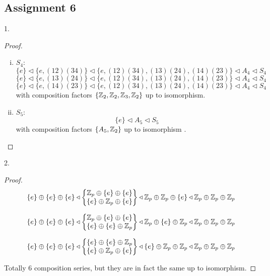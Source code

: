 \subsection{Assignment 6}

\begin{exercise}
    1.
\end{exercise}

\begin{proof}
    \begin{enumerate}[(i)]
        \item $S_4$:
        $$
        \{e\} \triangleleft \{e,(12)(34)\}  \triangleleft\{e,(12)(34),(13)(24),(14)(23)\} \triangleleft A_{4} \triangleleft S_{4}
        $$
        $$
        \{e\} \triangleleft \{e,(13)(24)\}  \triangleleft\{e,(12)(34),(13)(24),(14)(23)\} \triangleleft A_{4} \triangleleft S_{4}
        $$
        $$
        \{e\} \triangleleft \{e,(14)(23)\}  \triangleleft\{e,(12)(34),(13)(24),(14)(23)\} \triangleleft A_{4} \triangleleft S_{4}
        $$
        with composition factors $\{{\mathbb{Z}}_2, {\mathbb{Z}}_2, {\mathbb{Z}}_3, {\mathbb{Z}}_2\}$ up to isomorphism.
        \item $S_5$:
        $$
        \{e\} \triangleleft A_{5} \triangleleft S_{5}
        $$
        with composition factors $\{A_5, {\mathbb{Z}}_2\}$ up to isomorphism
        .
    \end{enumerate}
\end{proof}

\begin{exercise}
    2.
\end{exercise}

\begin{proof}
    $$
    \{e\} \oplus \{e\} \oplus \{e\} \triangleleft 
    \begin{Bmatrix}
    {\mathbb{Z}}_p \oplus \{e\} \oplus \{e\}     \\ 
    \{e\} \oplus {\mathbb{Z}}_p \oplus \{e\}   
    \end{Bmatrix}\triangleleft 
    {\mathbb{Z}}_p \oplus {\mathbb{Z}}_p \oplus \{e\}\triangleleft 
    {\mathbb{Z}}_p \oplus {\mathbb{Z}}_p \oplus {\mathbb{Z}}_p
    $$
    
    $$
    \{e\} \oplus \{e\} \oplus \{e\} \triangleleft 
    \begin{Bmatrix}
    {\mathbb{Z}}_p \oplus \{e\} \oplus \{e\}     \\ 
    \{e\} \oplus \{e\} \oplus {\mathbb{Z}}_p   
    \end{Bmatrix}\triangleleft 
    {\mathbb{Z}}_p \oplus \{e\} \oplus {\mathbb{Z}}_p\triangleleft 
    {\mathbb{Z}}_p \oplus {\mathbb{Z}}_p \oplus {\mathbb{Z}}_p
    $$

    
    $$
    \{e\} \oplus \{e\} \oplus \{e\} \triangleleft 
    \begin{Bmatrix}
    \{e\} \oplus \{e\} \oplus {\mathbb{Z}}_p     \\ 
    \{e\} \oplus {\mathbb{Z}}_p \oplus \{e\}   
    \end{Bmatrix}\triangleleft 
    \{e\} \oplus {\mathbb{Z}}_p \oplus {\mathbb{Z}}_p\triangleleft 
    {\mathbb{Z}}_p \oplus {\mathbb{Z}}_p \oplus {\mathbb{Z}}_p
    $$

    Totally 6 composition series, but they are in fact the same up to isomorphism.
\end{proof}

